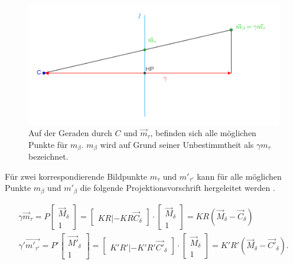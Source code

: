 \begin{figure}[!htb]
	\centering
	\includegraphics[width=0.8\linewidth]{images/gamma.png}
	\caption[Veranschaulichung der freien Variablen $\gamma$]{Auf der Geraden durch $C$ und $\overrightarrow{m}_\tau$, befinden sich alle möglichen Punkte für $m_\beta$. $m_\beta$ wird auf Grund seiner Unbestimmtheit als $\gamma m_\tau$ bezeichnet.}  
	\label{fig:gamma}
\end{figure}


Für zwei korrespondierende Bildpunkte $m_\tau$ und $ m'_{\tau'}$ kann für alle möglichen Punkte $m_\beta$ und $m'_\beta$ die folgende Projektionsvorschrift hergeleitet werden \cite{Elements}.

\begin{gather}
	\gamma \overrightarrow{m}_\tau = P \begin{bmatrix}\overrightarrow{M}_\delta\\1\end{bmatrix} = 
	\begin{bmatrix}KR|-KR\overrightarrow{C}_\delta\end{bmatrix}\cdot \begin{bmatrix}\overrightarrow{M}_\delta\\1\end{bmatrix} = KR(\overrightarrow{M}_\delta - \overrightarrow{C}_\delta)\\
	\gamma' \overrightarrow{m'_{\tau'}} = P' \begin{bmatrix}\overrightarrow{M'}_\delta\\1\end{bmatrix} = 
	\begin{bmatrix}K'R'|-K'R'\overrightarrow{C'}_\delta\end{bmatrix}\cdot \begin{bmatrix}\overrightarrow{M}_\delta\\1\end{bmatrix} = K'R'(\overrightarrow{M}_\delta - \overrightarrow{C'}_\delta).\label{eq:Homo}
\end{gather}\\


